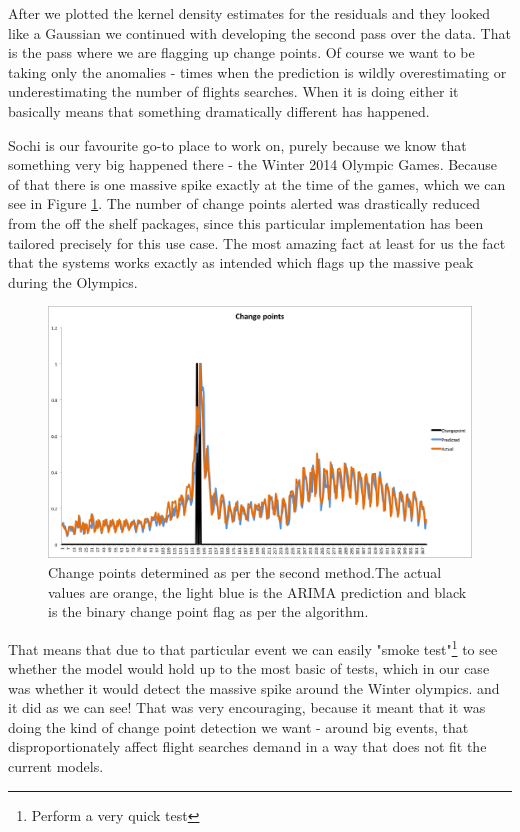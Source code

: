 \documentclass[minf,twoside,singlespacing,parskip,notimes,deptreport]{infthesis} %
\begin{document}
After we plotted the kernel density estimates for the residuals and they looked like a Gaussian we continued with developing the second pass over the data. That is the pass where we are flagging up change points. Of course we want to be taking only the anomalies - times when the prediction is wildly overestimating or underestimating the number of flights searches. When it is doing either it basically means that something dramatically different has happened. 


Sochi is our favourite go-to place to work on, purely because we know that something very big happened there - the Winter 2014 Olympic Games. Because of that there is one massive spike exactly at the time of the games, which we can see in Figure \ref{offline-method}. The number of change points alerted was drastically reduced from the off the shelf packages, since this particular implementation has been tailored precisely for this use case. The most amazing fact at least for us the fact that the systems works exactly as intended which flags up the massive peak during the Olympics. 

\begin{figure}[h!]
\begin{center}
\includegraphics[width=\textwidth]{Changepoint_99}
\end{center}
\caption{Change points determined as per the second method.The actual values are orange, the light blue is the ARIMA prediction and black is the binary change point flag as per the algorithm.}
\label{offline-method}
\end{figure}


That means that due to that particular event we can easily "smoke test"\footnote{Perform a very quick test} to see whether the model would hold up to the most basic of tests, which in our case was whether it would detect the massive spike around the Winter olympics. and it did as we can see! That was very encouraging, because it meant that it was doing the kind of change point detection we want - around big events, that disproportionately affect flight searches demand in a way that does not fit the current models. 
\end{document}
